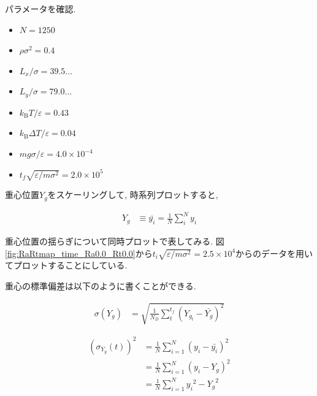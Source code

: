 

パラメータを確認.

\begin{itemize}
  \item $N = 1250$
  \item $\rho {\sigma}^2 = 0.4$
  \item $L_x / \sigma = 39.5\dots$
  \item $L_y / \sigma = 79.0\dots$
  \item $k_{\text{B}} T / \varepsilon = 0.43$
  \item $k_{\text{B}} \Delta T / \varepsilon = 0.04$
  \item $mg\sigma/\varepsilon = 4.0 \times 10^{-4}$
  \item $t_f \sqrt{\varepsilon / m \sigma^2} = 2.0 \times 10^{5}$
\end{itemize}



重心位置$Y_g$をスケーリングして, 時系列プロットすると,

\begin{align}
  Y_g &\equiv \bar{y_i} = \frac{1}{N} \sum_{i}^{N} y_i
\end{align}



重心位置の揺らぎについて同時プロットで表してみる. 図\ref{fig:RaRtmap_time_Ra0.0_Rt0.0}から$t_i \sqrt{\varepsilon / m \sigma^2} = 2.5 \times 10^{4}$からのデータを用いてプロットすることにしている.

重心の標準偏差は以下のように書くことができる.

\begin{align}
  \sigma (Y_g) &= \sqrt{\frac{1}{N_{D}}\sum_{t}^{t_f} (Y_{g_{t}} - \bar{Y_g})^2}
\end{align}



\begin{align}
  \left(\sigma_{Y_g} (t)\right)^2 
  &= \frac{1}{N} \sum_{i=1}^{N} (y_i - \bar{y_i} )^2 \\
  &= \frac{1}{N} \sum_{i=1}^{N} (y_i - Y_g )^2 \\
  &= \frac{1}{N} \sum_{i=1}^{N} {y_i}^2 - {Y_g}^2
\end{align}

